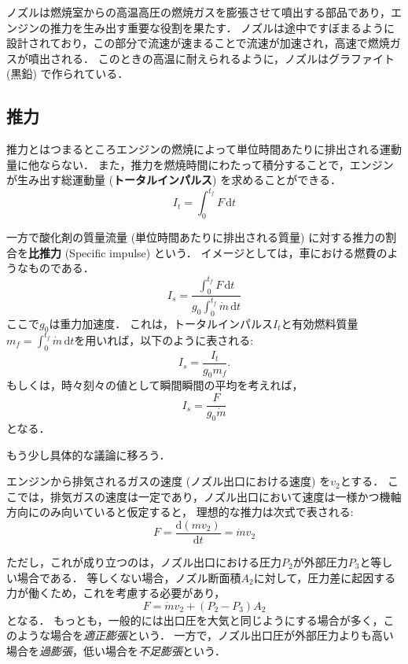 \documentclass[uplatex,dvipdfmx,a4j,11pt]{jsreport}
\newcommand{\keyword}[1]{\textcolor{mainblue}{\textbf{#1}}}
\newcommand{\diff}{\mathrm{d}} %
\numberwithin{equation}{chapter}
\begin{document}
ノズルは燃焼室からの高温高圧の燃焼ガスを膨張させて噴出する部品であり，エンジンの推力を生み出す重要な役割を果たす．
ノズルは途中ですぼまるように設計されており，この部分で流速が速まることで流速が加速され，高速で燃焼ガスが噴出される．
このときの高温に耐えられるように，ノズルはグラファイト (黒鉛) で作られている．

\subsection{推力}
推力とはつまるところエンジンの燃焼によって単位時間あたりに排出される運動量に他ならない．
また，推力を燃焼時間にわたって積分することで，エンジンが生み出す総運動量 (\keyword{トータルインパルス}) を求めることができる．
\begin{equation}
  I_{t} = \int_0^{t_f} F \, \diff t
\end{equation}

一方で酸化剤の質量流量 (単位時間あたりに排出される質量) に対する推力の割合を\keyword{比推力} (Specific impulse) という．
イメージとしては，車における燃費のようなものである．
\begin{equation}
  I_{s} = \frac{\int_0^{t_f} F \, \diff t}{ g_0 \int_0^{t_f} \dot{m} \, \diff t}
\end{equation}
ここで$g_0$は重力加速度．
これは，トータルインパルス$I_{t}$と有効燃料質量$m_f = \int_0^{t_f} \dot{m} \, \diff t$を用いれば，以下のように表される:
\begin{equation}
  I_{s} = \frac{I_{t}}{g_0 m_f}.
\end{equation}
もしくは，時々刻々の値として瞬間瞬間の平均を考えれば，
\begin{equation}
  I_{s} = \frac{F}{g_0 \dot{m}}
\end{equation}
となる．

\enskip

もう少し具体的な議論に移ろう．

エンジンから排気されるガスの速度 (ノズル出口における速度) を$v_2$とする．
ここでは，排気ガスの速度は一定であり，ノズル出口において速度は一様かつ機軸方向にのみ向いていると仮定すると，
理想的な推力は次式で表される:
\begin{equation}
  F = \frac{\diff (mv_2)}{\diff t} = \dot{m} v_2
\end{equation}

ただし，これが成り立つのは，ノズル出口における圧力$P_2$が外部圧力$P_3$と等しい場合である．
等しくない場合，ノズル断面積$A_2$に対して，圧力差に起因する力が働くため，これを考慮する必要があり，
\begin{equation}
  F = \dot{m} v_2 + (P_2 - P_3) A_2
\end{equation}
となる．
もっとも，一般的には出口圧を大気と同じようにする場合が多く，このような場合を\emph{適正膨張}という．
一方で，ノズル出口圧が外部圧力よりも高い場合を\emph{過膨張}，低い場合を\emph{不足膨張}という．
\end{document}
